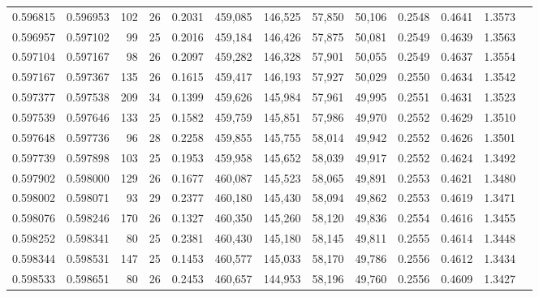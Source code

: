 \begin{tabular}{rrrrrrrrrrrrr}
0.596815 & 0.596953 &   102 &  26 &                                     0.2031 & 459,085 & 146,525 &  57,850 &  50,106 & 0.2548 & 0.4641 & 1.3573 \\
0.596957 & 0.597102 &    99 &  25 &                                     0.2016 & 459,184 & 146,426 &  57,875 &  50,081 & 0.2549 & 0.4639 & 1.3563 \\
0.597104 & 0.597167 &    98 &  26 &                                     0.2097 & 459,282 & 146,328 &  57,901 &  50,055 & 0.2549 & 0.4637 & 1.3554 \\
0.597167 & 0.597367 &   135 &  26 &                                     0.1615 & 459,417 & 146,193 &  57,927 &  50,029 & 0.2550 & 0.4634 & 1.3542 \\
0.597377 & 0.597538 &   209 &  34 &                                     0.1399 & 459,626 & 145,984 &  57,961 &  49,995 & 0.2551 & 0.4631 & 1.3523 \\
0.597539 & 0.597646 &   133 &  25 &                                     0.1582 & 459,759 & 145,851 &  57,986 &  49,970 & 0.2552 & 0.4629 & 1.3510 \\
0.597648 & 0.597736 &    96 &  28 &                                     0.2258 & 459,855 & 145,755 &  58,014 &  49,942 & 0.2552 & 0.4626 & 1.3501 \\
0.597739 & 0.597898 &   103 &  25 &                                     0.1953 & 459,958 & 145,652 &  58,039 &  49,917 & 0.2552 & 0.4624 & 1.3492 \\
0.597902 & 0.598000 &   129 &  26 &                                     0.1677 & 460,087 & 145,523 &  58,065 &  49,891 & 0.2553 & 0.4621 & 1.3480 \\
0.598002 & 0.598071 &    93 &  29 &                                     0.2377 & 460,180 & 145,430 &  58,094 &  49,862 & 0.2553 & 0.4619 & 1.3471 \\
0.598076 & 0.598246 &   170 &  26 &                                     0.1327 & 460,350 & 145,260 &  58,120 &  49,836 & 0.2554 & 0.4616 & 1.3455 \\
0.598252 & 0.598341 &    80 &  25 &                                     0.2381 & 460,430 & 145,180 &  58,145 &  49,811 & 0.2555 & 0.4614 & 1.3448 \\
0.598344 & 0.598531 &   147 &  25 &                                     0.1453 & 460,577 & 145,033 &  58,170 &  49,786 & 0.2556 & 0.4612 & 1.3434 \\
0.598533 & 0.598651 &    80 &  26 &                                     0.2453 & 460,657 & 144,953 &  58,196 &  49,760 & 0.2556 & 0.4609 & 1.3427 \\

\end{tabular}
